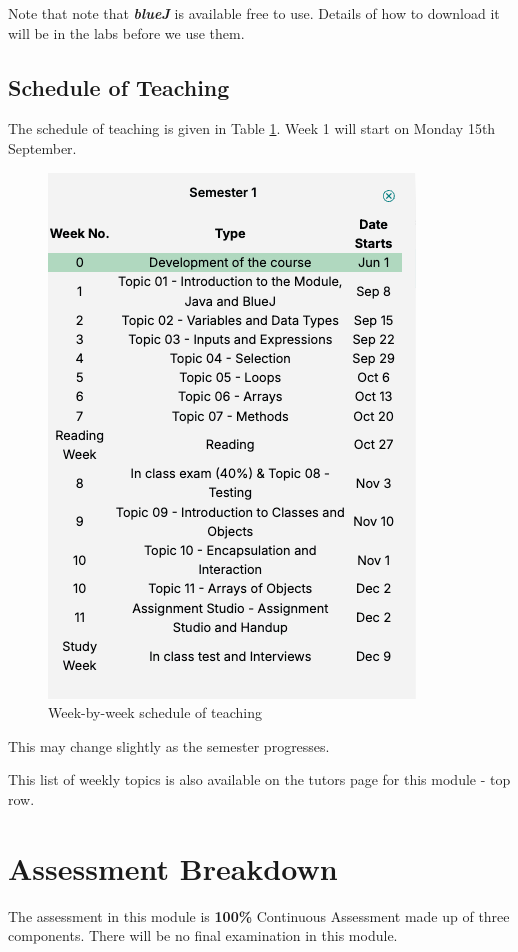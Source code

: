 \documentclass{article}
\begin{document}
Note that note that \textbf{\textit{blueJ}}
is available free to use. Details of how to download it will be in the labs before we use them. 
\pagebreak 

\subsection{Schedule of Teaching}
The schedule of teaching is given in Table \ref{schedule}. 
 Week 1 will start on Monday 15th September.
\begin{figure}[h]
    \centering
    \includegraphics[width=.6\textwidth]{img/schedule.png}
    \caption{Week-by-week schedule of teaching}
    \label{schedule}
    \end{figure}
This may change slightly as the semester progresses.

This list of weekly topics is also available on the tutors page for this module - top row.
  \pagebreak
\section{Assessment Breakdown} 
The assessment in this module is \textbf{100\%} Continuous Assessment made up of three components. There will be no final examination in this module. 
\end{document}
